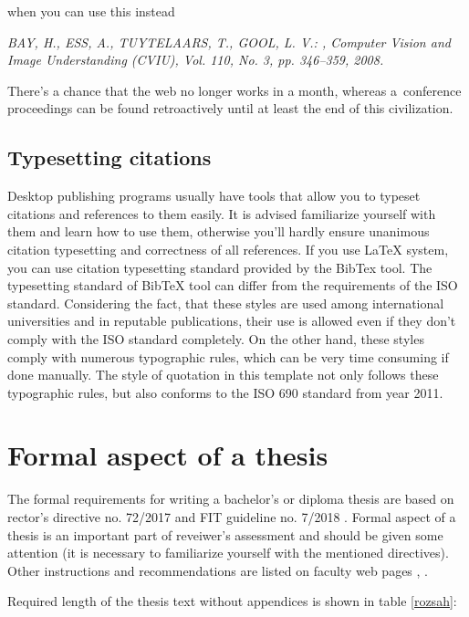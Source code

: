 \noindent when you can use this instead

\noindent \it BAY, H., ESS, A., TUYTELAARS, T., GOOL, L. V.: , Computer Vision and Image Understanding (CVIU), Vol. 110, No. 3, pp. 346–359, 2008.
\bigskip
\rm

There's a chance that the web no longer works in a month, whereas a~conference proceedings can be found retroactively until at least the end of this civilization.


\section{Typesetting citations}

Desktop publishing programs usually have tools that allow you to typeset citations and references to them easily. It is advised familiarize yourself with them and learn how to use them, otherwise you'll hardly ensure unanimous citation typesetting and correctness of all references. If you use LaTeX system, you can use citation typesetting standard provided by the BibTex tool. The typesetting standard of BibTeX tool can differ from the requirements of the ISO standard. Considering the fact, that these styles are used among international universities and in reputable publications, their use is allowed even if they don't comply with the ISO standard completely. On the other hand, these styles comply with numerous typographic rules, which can be very time consuming if done manually. The style of quotation in this template not only follows these typographic rules, but also conforms to the ISO 690 standard from year 2011.

\chapter{Formal aspect of a thesis}
\label{formality}

The formal requirements for writing a bachelor's or diploma thesis are based on rector's directive no. 72/2017 \cite{smernice} and FIT guideline no. 7/2018 \cite{smerniceFIT}. Formal aspect of a thesis is an important part of reveiwer's  assessment and should be given some attention (it is necessary to familiarize yourself with the mentioned directives). Other instructions and recommendations are listed on faculty web pages \cite{formalniBP}, \cite{formalniDP}.

Required length of the thesis text without appendices is shown in table \ref{rozsah}: 


